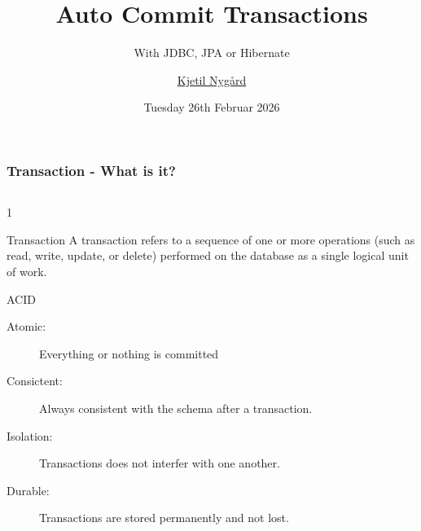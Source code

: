 \documentclass{beamer}
\title{Auto Commit Transactions}
\subtitle{With JDBC, JPA or Hibernate}
\author{\href{kjetil.nygard@tieto.com}{Kjetil Nygård}}
\institute{Tieto}
\date{Tuesday 26th Februar 2026}
\begin{document}
	\frame{\titlepage}

	\begin{frame}
		\frametitle{Transaction - What is it?}
		\begin{columns}[t]
			\begin{column}{1\textwidth}
				\begin{block}{Transaction}
						A transaction refers to a sequence of one or more operations
						(such as read, write, update, or delete) performed on the database
						as a single logical unit of work. 
				\end{block}
				\begin{block}{ACID}
						\begin{description}
							\item[Atomic:] Everything or nothing is committed
							\item[Consictent:] Always consistent with the schema after a transaction.
							\item[Isolation:] Transactions does not interfer with one another.
							\item[Durable:] Transactions are stored permanently and not lost.
						\end{description}
				\end{block}
			\end{column}
		\end{columns}
	\end{frame}
\end{document}
